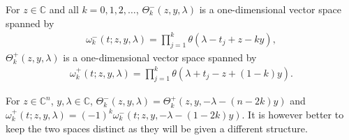 \documentclass[pdftex]{sigma}
\numberwithin{equation}{section}
\begin{document}
\begin{Example}\label{example-4} For $z\in\mathbb C$ and all $k=0,1,2,\dots$, $\Theta^-_k(z,y,\lambda)$ is a one-dimensional vector space
 spanned by
 \begin{gather*}
 \omega^-_k(t;z,y,\lambda)=\prod_{j=1}^k\theta(\lambda-t_j+z-ky),
 \end{gather*}
 $\Theta^+_k(z,y,\lambda)$ is a one-dimensional vector space spanned by
 \begin{gather*}
 \omega^+_k(t;z,y,\lambda) =\prod_{j=1}^k\theta(\lambda+t_j-z+(1-k)y).
 \end{gather*}
\end{Example}
 \begin{Remark}\label{remark-2} For $z\in\mathbb C^n$, $y,\lambda\in\mathbb C$, $\Theta^-_k(z,y,\lambda)=\Theta^+_k(z,y,-\lambda-(n-2k)y)$ and $\omega^+_k(t;z,y,\lambda)=(-1)^k\omega^-_k(t;z,y,-\lambda-(1-2k)y)$. It is however better to keep the two spaces distinct as they will be given a different structure.
 \end{Remark}
\end{document}
